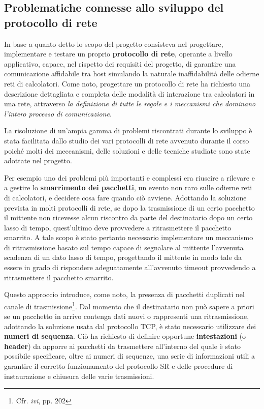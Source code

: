 \documentclass[10pt,a4paper, titlepage]{article}
\begin{document}
\subsection{Problematiche connesse allo sviluppo del protocollo di rete}

In base a quanto detto lo scopo del progetto consisteva nel progettare, implementare e testare un proprio \textbf{protocollo di rete}, operante a livello applicativo, capace, nel rispetto dei requisiti del progetto, di garantire una comunicazione affidabile tra host simulando la naturale inaffidabilità delle odierne reti di calcolatori. 
Come noto, progettare un protocollo di rete ha richiesto una descrizione dettagliata e completa delle modalità di interazione tra calcolatori in una rete, attraverso \textit{la definizione di tutte le regole e i meccanismi che dominano l'intero processo di comunicazione}. 

La risoluzione di un'ampia gamma di problemi riscontrati durante lo sviluppo è stata facilitata dallo studio dei vari protocolli di rete avvenuto durante il corso poiché molti dei meccanismi, delle soluzioni e delle tecniche studiate sono state adottate nel progetto.

Per esempio uno dei problemi più importanti e complessi era riuscire a rilevare e a gestire lo \textbf{smarrimento dei pacchetti}, un evento non raro sulle odierne reti di calcolatori, e decidere cosa fare quando ciò avviene. Adottando la soluzione prevista in molti protocolli di rete, se dopo la trasmissione di un certo pacchetto il mittente non ricevesse alcun riscontro da parte del destinatario dopo un certo lasso di tempo, quest'ultimo deve provvedere a ritrasmettere il pacchetto smarrito. A tale scopo è stato pertanto necessario implementare un meccanismo di ritrasmissione basato sul tempo capace di segnalare al mittente l'avvenuta scadenza di un dato lasso di tempo, progettando il mittente in modo tale da essere in grado di rispondere adeguatamente all'avvenuto timeout provvedendo a ritrasmettere il pacchetto smarrito.

Questo approccio introduce, come noto, la presenza di pacchetti duplicati nel canale di trasmissione\footnote{Cfr. \textit{ivi}, pp. 202}.  Dal momento che il destinatario non può sapere a priori se un pacchetto in arrivo contenga dati nuovi o rappresenti una ritrasmissione, adottando la soluzione usata dal protocollo TCP, è stato necessario utilizzare dei \textbf{numeri di sequenza}. Ciò ha richiesto di definire opportune \textbf{intestazioni} (o \textbf{header}) da apporre ai pacchetti da trasmettere all'interno del quale è stato possibile specificare, oltre ai numeri di sequenze, una serie di informazioni utili a garantire il corretto funzionamento del protocollo SR e delle procedure di instaurazione e chiusura delle varie trasmissioni.
\end{document}
